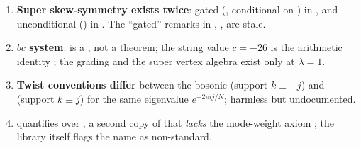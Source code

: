 \begin{enumerate}[label=(F\arabic*)]
\item \textbf{Super skew-symmetry exists twice}: gated (, conditional on
  ) in , and unconditional
  () in . The
  ``gated'' remarks in ,
  , 
  are stale.
\item \textbf{$bc$ system}:  is a , not a theorem; the string value
  $c=-26$ is the arithmetic identity ; the grading and the super vertex
  algebra exist only at $\lambda=1$.
\item \textbf{Twist conventions differ} between the bosonic  (support
  $k\equiv -j$) and  (support $k\equiv j$) for the same eigenvalue
  $e^{-2\pi i j/N}$; harmless but undocumented.
\item {} quantifies over , a second copy of
   that \emph{lacks} the mode-weight axiom ; the library
  itself flags the name as non-standard.
\end{enumerate}

